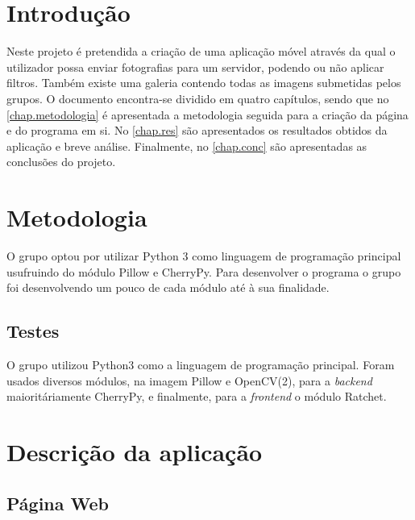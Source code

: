 \documentclass{report}
\begin{document}

\tableofcontents


%
\clearpage
{} %
%
\chapter{Introdução}
\label{chap.introducao} 

Neste projeto é pretendida a criação de uma aplicação móvel através da qual o utilizador possa enviar fotografias para um servidor, podendo ou não aplicar filtros. Também existe uma galeria contendo todas as imagens submetidas pelos grupos.
O documento encontra-se dividido em quatro capítulos,
sendo que no \autoref{chap.metodologia} é apresentada a metodologia seguida para a criação da página e do programa em si.
No \autoref{chap.res} são apresentados os resultados obtidos da aplicação e breve análise.
Finalmente, no \autoref{chap.conc} são apresentadas
as conclusões do projeto.


\chapter{Metodologia}
\label{chap.metodologia}

O grupo optou por utilizar Python 3 como linguagem de programação principal usufruindo do módulo Pillow e CherryPy. Para desenvolver o programa o grupo foi desenvolvendo um pouco de cada módulo até à sua finalidade.

\section{Testes}

O grupo utilizou Python3 como a linguagem de programação principal. Foram usados diversos módulos, na imagem Pillow e OpenCV(2), para a \textit{backend} maioritáriamente CherryPy, e finalmente, para a \textit{frontend} o módulo Ratchet.


\chapter{Descrição da aplicação}
\label{chap.desc}

\section{Página Web}
\end{document}
